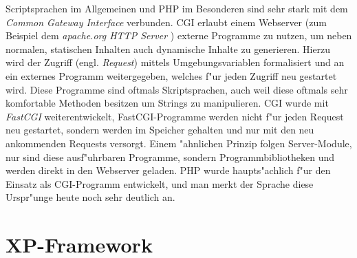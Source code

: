 Scriptsprachen im Allgemeinen und PHP im Besonderen sind sehr stark mit dem \emph{Common Gateway Interface} verbunden.
CGI erlaubt einem Webserver (zum Beispiel dem \emph{apache.org HTTP Server} \cite{APACHEHP}) externe Programme zu nutzen, um
neben normalen, statischen Inhalten auch dynamische Inhalte zu generieren. Hierzu wird der Zugriff (engl. \emph{Request}) mittels
Umgebungsvariablen formalisiert und an ein externes Programm weitergegeben, welches f"ur jeden Zugriff neu gestartet wird.
Diese Programme sind oftmals Skriptsprachen, auch weil diese oftmals sehr komfortable Methoden besitzen um Strings zu manipulieren.
CGI wurde mit \emph{FastCGI} weiterentwickelt, FastCGI-Programme werden nicht f"ur jeden Request neu gestartet, sondern werden
im Speicher gehalten und nur mit den neu ankommenden Requests versorgt. Einem "ahnlichen Prinzip folgen Server-Module, nur sind
diese ausf"uhrbaren Programme, sondern Programmbibliotheken und werden direkt in den Webserver geladen.
PHP wurde haupts"achlich f"ur den Einsatz als CGI-Programm entwickelt, und man merkt der Sprache diese Urspr"unge heute noch sehr
deutlich an.


\section{XP-Framework}
\label{sec:background:xp}

